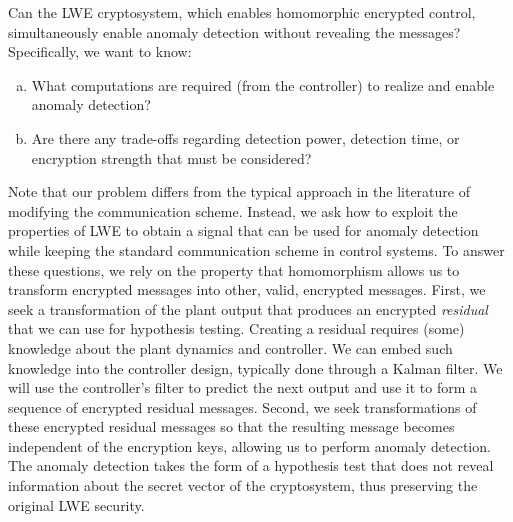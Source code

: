 \documentclass[journal, twoside, web]{ieeecolorpreprint}
\begin{document}
\begin{informalProblem}
    Can the LWE cryptosystem, which enables homomorphic encrypted control, simultaneously enable anomaly detection without revealing the messages? Specifically, we want to know:
    \begin{enumerate}[a)]
        \item What computations are required (from the controller) to realize and enable anomaly detection?
        \item Are there any trade-offs regarding detection power, detection time, or encryption strength that must be considered?
    \end{enumerate}
\end{informalProblem}

Note that our problem differs from the typical approach in the literature of modifying the communication scheme. Instead, we ask how to exploit the properties of LWE to obtain a signal that can be used for anomaly detection while keeping the standard communication scheme in control systems. To answer these questions, we rely on the property that homomorphism allows us to transform encrypted messages into other, valid, encrypted messages. First, we seek a transformation of the plant output that produces an encrypted \emph{residual} that we can use for hypothesis testing. Creating a residual requires (some) knowledge about the plant dynamics and controller. We can embed such knowledge into the controller design, typically done through a Kalman filter. We will use the controller's filter to predict the next output and use it to form a sequence of encrypted residual messages. Second, we seek transformations of these encrypted residual messages so that the resulting message becomes independent of the encryption keys, allowing us to perform anomaly detection. The anomaly detection takes the form of a hypothesis test that does not reveal information about the secret vector of the cryptosystem, thus preserving the original LWE security.
\end{document}
